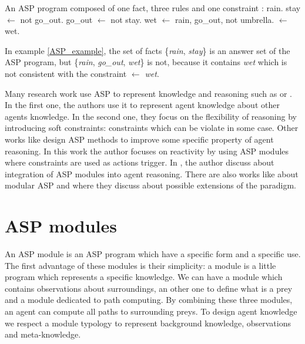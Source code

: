 \documentclass{aamas2012}
\begin{document}
	\begin{example}
		\label{ASP_example}
		An ASP program composed of one fact, three rules and one constraint :\newline
		\newline
		rain.\newline
		stay $\leftarrow$ not go\_out.\newline
		go\_out $\leftarrow$ not stay.\newline
		wet $\leftarrow$ rain, go\_out, not umbrella.\newline
		$\leftarrow$ wet.
	\end{example}
	
	In example \ref{ASP_example}, the set of facts \{\emph{rain}, \emph{stay}\} is an answer set of the ASP program, but \{\emph{rain}, \emph{go\_out}, \emph{wet}\} is not, 
	because it contains \emph{wet} which is not consistent with the constraint \emph{$\leftarrow$ wet}.
	
	Many research work use ASP to represent knowledge and reasoning such as \cite{DBLP:conf/atal/BaralGSP10} or \cite{DBLP:conf/clima/NieuwenborghVHV06}.
	In the first one, the authors use it to represent agent knowledge about other agents knowledge.
	In the second one, they focus on the flexibility of reasoning by introducing soft constraints: constraints which can be violate in some case.
	Other works like \cite{DBLP:conf/datalog/Costantini10} design ASP methods to improve some specific property of agent reasoning.
	In this work the author focuses on reactivity by using ASP modules where constraints are used as actions trigger.
	In \cite{DBLP:conf/lpnmr/Costantini09}, the author discuss about integration of ASP modules into agent reasoning.
	There are also works like \cite{DBLP:conf/aaaiss/BaralAD06} about modular ASP and 
	\cite{DBLP:conf/birthday/FaberW11} where they discuss about possible extensions of the paradigm.

\section{ASP modules}

	An ASP module is an ASP program which have a specific form and a specific use.
	The first advantage of these modules is their simplicity: a module is a little program which represents a specific knowledge.
	We can have a module which contains observations about surroundings,
	an other one to define what is a prey and a module dedicated to path computing.
	By combining these three modules, an agent can compute all paths to surrounding preys.
	To design agent knowledge we respect a module typology to represent background knowledge, observations and meta-knowledge.
\end{document}
